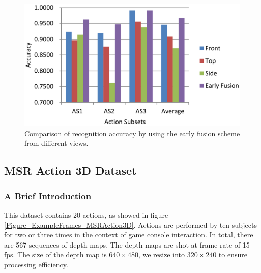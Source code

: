 \documentclass[final,3p,times,twocolumn]{elsarticle}
\begin{document}
\begin{figure}[h]
	\centering
	\includegraphics[width=\columnwidth]{Figures/Chart_EarlyFusion_AS123_MBH.pdf}
	\caption{Comparison of recognition accuracy by using the early fusion scheme from different views.}
	\label{lbl:Figure_EarlyFusion_AS123_MBH}
\end{figure}

\subsection{MSR Action 3D Dataset}

\subsubsection{A Brief Introduction}
This dataset \cite{li2010action} contains 20 actions, as showed in figure \ref{Figure_ExampleFrames_MSRAction3D}. Actions are performed by ten subjects for two or three times in the context of game console interaction. In total, there are 567 sequences of depth maps. The depth maps are shot at frame rate of 15 fps. The size of the depth map is $640 \times 480$, we resize into $320 \times 240$ to ensure processing efficiency.
\end{document}

